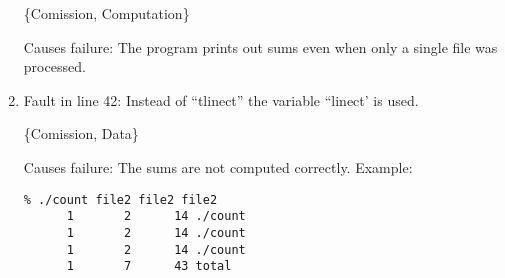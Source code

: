 \begin{enumerate}
\{Comission, Computation\}

Causes failure:
The program prints out sums even when only a single file was
processed.


\item Fault in line 42: Instead of ``tlinect'' the variable ``linect'
is used.

\{Comission, Data\}

Causes failure:
The sums are not computed correctly.  Example:
{\small
\begin{verbatim}
% ./count file2 file2 file2
      1       2      14 ./count
      1       2      14 ./count
      1       2      14 ./count
      1       7      43 total
\end{verbatim}
}
\end{enumerate}


